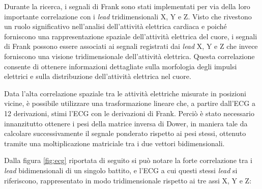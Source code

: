 \documentclass[12pt,italian]{report}
\begin{document}
Durante la ricerca, i segnali di Frank sono stati implementati per via della loro importante correlazione con i \textit{lead} tridimensionali X, Y e Z. Visto che rivestono un ruolo significativo nell'analisi dell'attività elettrica cardiaca e poiché forniscono una rappresentazione spaziale dell'attività elettrica del cuore, i segnali di Frank possono essere associati ai segnali registrati dai \textit{lead} X, Y e Z che invece forniscono una visione tridimensionale dell'attività elettrica. Questa correlazione consente di ottenere informazioni dettagliate sulla morfologia degli impulsi elettrici e sulla distribuzione dell'attività elettrica nel cuore.

Data l'alta correlazione spaziale tra le attività elettriche misurate in posizioni vicine, è possibile utilizzare una trasformazione lineare che, a partire dall'ECG a 12 derivazioni, stimi l'ECG con le derivazioni di Frank. Perciò è stato necessario innanzitutto ottenere i pesi della matrice inversa di Dower, in maniera tale da calcolare successivamente il segnale ponderato rispetto ai pesi stessi, ottenuto tramite una moltiplicazione matriciale tra i due vettori bidimensionali.

Dalla figura \ref{fig:ecg} riportata di seguito si può notare la forte correlazione tra i \textit{lead} bidimensionali di un singolo battito, e l'ECG a cui questi stessi \textit{lead} si riferiscono, rappresentato in modo tridimensionale rispetto ai tre assi X, Y e Z:
\end{document}
